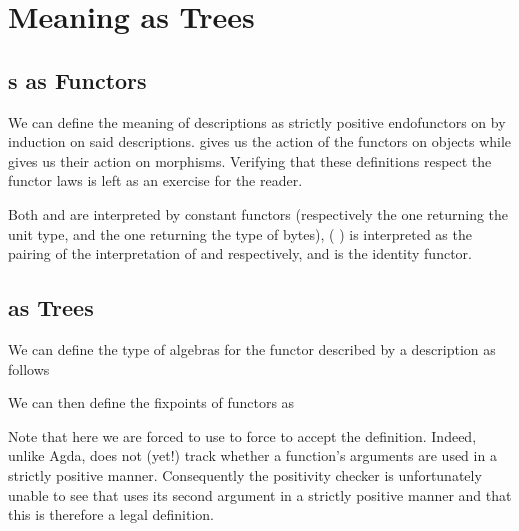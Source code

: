 \section{Meaning as Trees}\label{sec:trees}

\subsection{s as Functors}

We can define the meaning of descriptions as strictly positive
endofunctors on  by induction on said descriptions.
%
 gives us the action of the functors on objects
while  gives us their action on morphisms.
%
Verifying that these definitions respect the functor laws is left as
an exercise for the reader.

Both  and  are interpreted by constant
functors (respectively the one returning the unit type, and the one returning
the type of bytes),
%
(  ) is interpreted as the
pairing of the interpretation of  and  respectively,
%
and  is the identity functor.





\subsection{ as Trees}

We can define the type of algebras for the functor described by a
 description as follows


We can then define the fixpoints of functors as



%
Note that here we are forced to use \assertTotal{} to force \idris{}
to accept the definition.
%
Indeed, unlike Agda, \idris{} does not (yet!) track whether a function's
arguments are used in a strictly positive manner.
%
Consequently the positivity checker
is unfortunately unable to see that  uses its second
argument in a strictly positive manner
and that this is therefore a legal definition.

